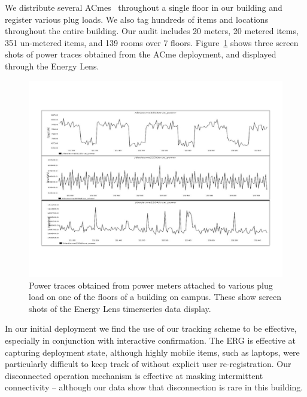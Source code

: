 We distribute several ACmes~\cite{acmemeter} throughout a single floor in our building and register various plug loads.  We also tag
hundreds of items and locations throughout the entire building.  Our audit includes 20 meters, 20 metered items, 351 un-metered items,
 and 139 rooms over 7 floors.  Figure~\ref{fig:tsdata} shows three screen shots of power traces obtained from the ACme deployment, and displayed
 through the Energy Lens. 

\begin{figure}[htb!]
\begin{center}
\includegraphics[scale=0.33]{figs/graphs_screen}
\caption{Power traces obtained from power meters attached to various plug load on one of the floors of
a building on campus.  These show screen shots of the Energy Lens timerseries data display.}
\label{fig:tsdata}
\end{center}
\end{figure}

In our initial deployment we find the use of our tracking scheme to be effective, especially in conjunction with
interactive confirmation.  The ERG is effective at capturing deployment state, although highly mobile items, such as laptops,
were particularly difficult to keep track of without explicit user re-registration.  Our disconnected operation mechanism is 
effective at masking 
intermittent connectivity -- although our data show that disconnection is rare in this building.  


